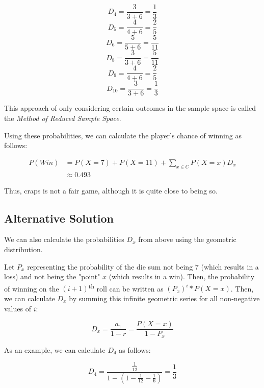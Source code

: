 \documentclass{article}
\begin{document}
$$D_4 = \frac{3}{3+6} = \frac{1}{3}$$
$$D_5 = \frac{4}{4+6} = \frac{2}{5}$$
$$D_6 = \frac{5}{5+6} = \frac{5}{11}$$
$$D_8 = \frac{3}{3+6} = \frac{5}{11}$$
$$D_9 = \frac{4}{4+6} = \frac{2}{5}$$
$$D_{10} = \frac{3}{3+6} = \frac{1}{3}$$

This approach of only considering certain outcomes in the sample 
space is called the \textit{Method of Reduced Sample Space}.

Using these probabilities, we can calculate the player's 
chance of winning as follows:

\begin{equation*}
\begin{split}
P(Win) &= P(X=7) + P(X=11) + \sum_{x \in C} P(X=x)D_x \\
&\approx 0.493
\end{split}
\end{equation*}

Thus, craps is not a fair game, although it is quite 
close to being so.

\subsection{Alternative Solution}
We can also calculate the probabilities $D_x$ from above 
using the geometric distribution. 

Let $P_x$ representing the probability of the die sum not being 
$7$ (which results in a loss) and not being the "point" $x$ (which results 
in a win). Then, the probability of winning on the $(i + 1)$\textsuperscript{th} 
roll can be written as $(P_x)^i*P(X=x)$. Then, we can calculate 
$D_x$ by summing this infinite geometric series for all non-negative 
values of $i$:

$$
D_x = \frac{a_1}{1-r} = \frac{P(X=x)}{1 - P_x}
$$

As an example, we can calculate $D_4$ as follows:

$$
D_4 = \frac{\frac{1}{12}}{1-\left( 1 - \frac{1}{12} - \frac{1}{6} \right)} 
= \frac{1}{3}
$$
\end{document}

